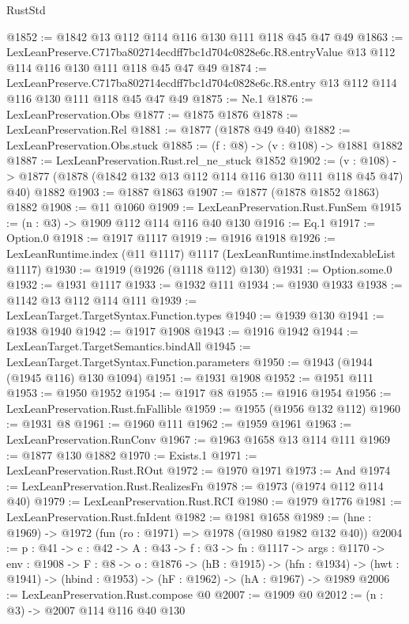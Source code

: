 \begin{lexlean}{RustStd}
\begin{coremodule}
@1852 := @1842 @13 @112 @114 @116 @130 @111 @118 @45 @47 @49
@1863 := LexLeanPreserve.C717ba802714ecdff7bc1d704c0828e6c.R8.entryValue
    @13
    @112
    @114
    @116
    @130
    @111
    @118
    @45
    @47
    @49
@1874 := LexLeanPreserve.C717ba802714ecdff7bc1d704c0828e6c.R8.entry
    @13
    @112
    @114
    @116
    @130
    @111
    @118
    @45
    @47
    @49
@1875 := Ne.{1}
@1876 := LexLeanPreservation.Obs
@1877 := @1875 @1876
@1878 := LexLeanPreservation.Rel
@1881 := @1877 (@1878 @49 @40)
@1882 := LexLeanPreservation.Obs.stuck
@1885 := (f : @8) -> (v : @108) -> @1881 @1882
@1887 := LexLeanPreservation.Rust.rel_ne_stuck @1852
@1902 := (v : @108) ->
  @1877 (@1878 (@1842 @132 @13 @112 @114 @116 @130 @111 @118 @45 @47) @40) @1882
@1903 := @1887 @1863
@1907 := @1877 (@1878 @1852 @1863) @1882
@1908 := @11 @1060
@1909 := LexLeanPreservation.Rust.FunSem
@1915 := (n : @3) -> @1909 @112 @114 @116 @40 @130
@1916 := Eq.{1}
@1917 := Option.{0}
@1918 := @1917 @1117
@1919 := @1916 @1918
@1926 := LexLeanRuntime.index (@11 @1117) @1117 (LexLeanRuntime.instIndexableList @1117)
@1930 := @1919 (@1926 (@1118 @112) @130)
@1931 := Option.some.{0}
@1932 := @1931 @1117
@1933 := @1932 @111
@1934 := @1930 @1933
@1938 := @1142 @13 @112 @114 @111
@1939 := LexLeanTarget.TargetSyntax.Function.types
@1940 := @1939 @130
@1941 := @1938 @1940
@1942 := @1917 @1908
@1943 := @1916 @1942
@1944 := LexLeanTarget.TargetSemantics.bindAll
@1945 := LexLeanTarget.TargetSyntax.Function.parameters
@1950 := @1943 (@1944 (@1945 @116) @130 @1094)
@1951 := @1931 @1908
@1952 := @1951 @111
@1953 := @1950 @1952
@1954 := @1917 @8
@1955 := @1916 @1954
@1956 := LexLeanPreservation.Rust.fnFallible
@1959 := @1955 (@1956 @132 @112)
@1960 := @1931 @8
@1961 := @1960 @111
@1962 := @1959 @1961
@1963 := LexLeanPreservation.RunConv
@1967 := @1963 @1658 @13 @114 @111
@1969 := @1877 @130 @1882
@1970 := Exists.{1}
@1971 := LexLeanPreservation.Rust.ROut
@1972 := @1970 @1971
@1973 := And
@1974 := LexLeanPreservation.Rust.RealizesFn
@1978 := @1973 (@1974 @112 @114 @40)
@1979 := LexLeanPreservation.Rust.RCI
@1980 := @1979 @1776
@1981 := LexLeanPreservation.Rust.fnIdent
@1982 := @1981 @1658
@1989 := (hne : @1969) -> @1972 (fun (ro : @1971) => @1978 (@1980 @1982 @132 @40))
@2004 := {p : @41} ->
  {c : @42} ->
  {A : @43} ->
  {f : @3} ->
  {fn : @1117} ->
  {args : @1170} ->
  {env : @1908} ->
  {F : @8} ->
  {o : @1876} ->
  (hB : @1915) ->
  (hfn : @1934) -> (hwt : @1941) -> (hbind : @1953) -> (hF : @1962) -> (hA : @1967) -> @1989
@2006 := LexLeanPreservation.Rust.compose @0
@2007 := @1909 @0
@2012 := (n : @3) -> @2007 @114 @116 @40 @130

\end{coremodule}
\end{lexlean}
